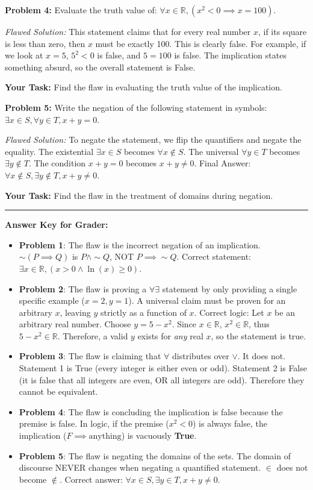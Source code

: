 \documentclass[12pt]{article}
\begin{document}
\vspace{0.5cm}
\textbf{Problem 4:} Evaluate the truth value of: $\forall x \in \mathbb{R}, (x^2 < 0 \implies x = 100)$.
\begin{mdframed}
\textit{Flawed Solution:} 
This statement claims that for every real number $x$, if its square is less than zero, then $x$ must be exactly 100. This is clearly false. For example, if we look at $x = 5$, $5^2 < 0$ is false, and $5 = 100$ is false. The implication states something absurd, so the overall statement is False.
\end{mdframed}
\textbf{Your Task:} Find the flaw in evaluating the truth value of the implication.

\vspace{0.5cm}
\textbf{Problem 5:} Write the negation of the following statement in symbols: $\exists x \in S, \forall y \in T, x+y = 0$.
\begin{mdframed}
\textit{Flawed Solution:} 
To negate the statement, we flip the quantifiers and negate the equality. 
The existential $\exists x \in S$ becomes $\forall x \notin S$.
The universal $\forall y \in T$ becomes $\exists y \notin T$.
The condition $x+y=0$ becomes $x+y \neq 0$.
Final Answer: $\forall x \notin S, \exists y \notin T, x+y \neq 0$.
\end{mdframed}
\textbf{Your Task:} Find the flaw in the treatment of domains during negation.

\vspace{1cm}
\hrule
\vspace{0.5cm}
\textbf{Answer Key for Grader:}
\begin{itemize}
    \item \textbf{Problem 1}: The flaw is the incorrect negation of an implication. $\sim(P \implies Q)$ is $P \land \sim Q$, NOT $P \implies \sim Q$. Correct statement: $\exists x \in \mathbb{R}, (x > 0 \land \ln(x) \ge 0)$.
    \item \textbf{Problem 2}: The flaw is proving a $\forall \exists$ statement by only providing a single specific example ($x=2, y=1$). A universal claim must be proven for an arbitrary $x$, leaving $y$ strictly as a function of $x$. Correct logic: Let $x$ be an arbitrary real number. Choose $y = 5 - x^2$. Since $x \in \mathbb{R}$, $x^2 \in \mathbb{R}$, thus $5-x^2 \in \mathbb{R}$. Therefore, a valid $y$ exists for \textit{any} real $x$, so the statement is true.
    \item \textbf{Problem 3}: The flaw is claiming that $\forall$ distributes over $\lor$. It does not. Statement 1 is True (every integer is either even or odd). Statement 2 is False (it is false that all integers are even, OR all integers are odd). Therefore they cannot be equivalent.
    \item \textbf{Problem 4}: The flaw is concluding the implication is false because the premise is false. In logic, if the premise ($x^2 < 0$) is always false, the implication ($F \implies \text{anything}$) is vacuously \textbf{True}.
    \item \textbf{Problem 5}: The flaw is negating the domains of the sets. The domain of discourse NEVER changes when negating a quantified statement. $\in$ does not become $\notin$. Correct answer: $\forall x \in S, \exists y \in T, x+y \neq 0$.
\end{itemize}
\end{document}
